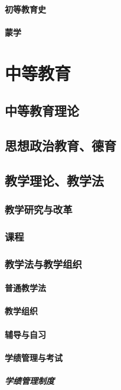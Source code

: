 \documentclass[UTF8]{../../ApplicationUniverse}
\begin{document}
    \subsubsection{初等教育史}
    \subsubsection{蒙学}





\chapter{中等教育}
\section{中等教育理论}
\section{思想政治教育、德育}
\section{教学理论、教学法}
    \subsection{教学研究与改革}
    \subsection{课程}
    \subsection{教学法与教学组织}
        \subsubsection{普通教学法}
        \subsubsection{教学组织}
        \subsubsection{辅导与自习}
        \subsubsection{学绩管理与考试}
            \paragraph{学绩管理制度}
\end{document}
